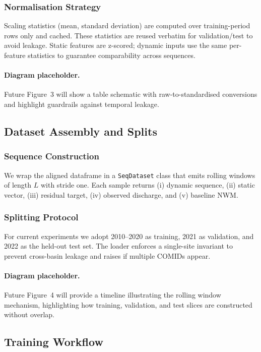 \documentclass[draft]{agujournal2019}
\begin{document}
\subsubsection{Normalisation Strategy}
Scaling statistics (mean, standard deviation) are computed over training-period rows only and cached. These statistics are reused verbatim for validation/test to avoid leakage. Static features are z-scored; dynamic inputs use the same per-feature statistics to guarantee comparability across sequences.

\paragraph{Diagram placeholder.} Future Figure~3 will show a table schematic with raw-to-standardised conversions and highlight guardrails against temporal leakage.

\subsection{Dataset Assembly and Splits}
\subsubsection{Sequence Construction}
We wrap the aligned dataframe in a \texttt{SeqDataset} class that emits rolling windows of length \(L\) with stride one. Each sample returns (i) dynamic sequence, (ii) static vector, (iii) residual target, (iv) observed discharge, and (v) baseline NWM.

\subsubsection{Splitting Protocol}
For current experiments we adopt 2010--2020 as training, 2021 as validation, and 2022 as the held-out test set. The loader enforces a single-site invariant to prevent cross-basin leakage and raises if multiple COMIDs appear.

\paragraph{Diagram placeholder.} Future Figure~4 will provide a timeline illustrating the rolling window mechanism, highlighting how training, validation, and test slices are constructed without overlap.

\subsection{Training Workflow}
\end{document}
